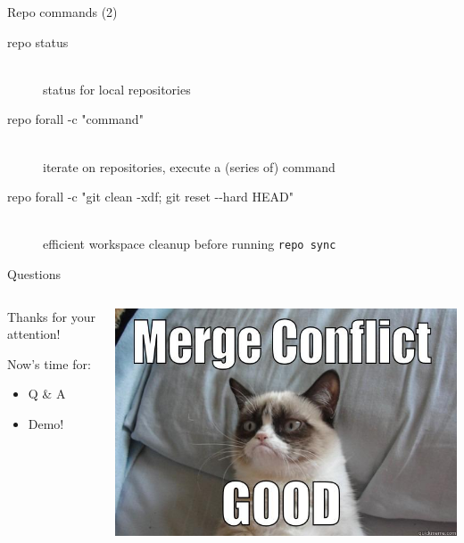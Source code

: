 \documentclass{beamer}
\begin{document}
\begin{frame}{Repo commands (2)}
  \begin{description}
    \item[repo status] \hfill \\
      status for local repositories
    \item[repo forall -c "command"] \hfill \\
      iterate on repositories, execute a (series of) command
    \item[repo forall -c "git clean -xdf; git reset -{}-hard HEAD"] \hfill \\
      efficient workspace cleanup before running \texttt{repo sync}
  \end{description}
\end{frame}

\begin{frame}{Questions}
  \begin{columns}[t]
    \begin{column}{0.4\textwidth}
      Thanks for your attention!

      Now's time for:
      \begin{itemize}
      \item Q \& A
      \item Demo!
      \end{itemize}
    \end{column}
    \begin{column}{0.6\textwidth}
      \begin{center}
        \includegraphics[width=\textwidth]{img/gitgrumpy.jpg}
      \end{center}
    \end{column}
  \end{columns}
\end{frame}
\end{document}
